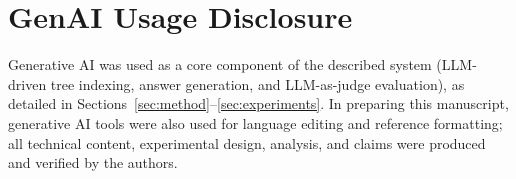 \documentclass[sigconf,review,anonymous]{acmart}
\begin{document}
\section*{GenAI Usage Disclosure}
Generative AI was used as a core component of the described system (LLM-driven
tree indexing, answer generation, and LLM-as-judge evaluation), as detailed in
Sections~\ref{sec:method}--\ref{sec:experiments}. In preparing this manuscript,
generative AI tools were also used for language editing and reference
formatting; all technical content, experimental design, analysis, and claims
were produced and verified by the authors.
\end{document}

